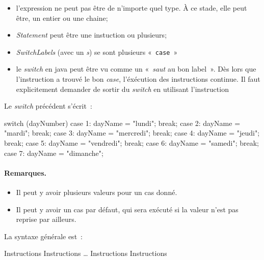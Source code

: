 	\begin{itemize}
		\item l'expression ne peut pas être de n'importe quel type. À ce stade, 
			elle peut être, un entier ou une chaine;
		\item \textit{Statement} peut être une instuction ou plusieurs;
		\item \textit{SwitchLabels} (avec un \textit{s}) se sont plusieurs 
			«~\texttt{case}~»
		
		\item le \textit{switch} en java peut être vu comme un «~\textit{saut}
			au bon label~». Dès lors que l'instruction a trouvé le bon
			\textit{case}, l'éxécution des instructions continue. Il faut
			explicitement demander de sortir du \textit{switch} en utilisant
			l'instruction \textbf{}

	\end{itemize}

	Le \textit{switch} précédent s'écrit~:

	\begin{java}
switch (dayNumber) {
	case 1: 
		dayName = "lundi"; 
		break;
	case 2: 
		dayName = "mardi"; 
		break;
	case 3: 
		dayName = "mercredi"; 
		break;
	case 4: 
		dayName = "jeudi"; 
		break;
	case 5: 
		dayName = "vendredi"; 
		break;
	case 6: 
		dayName = "samedi"; 
		break;
	case 7: 
		dayName = "dimanche";
}
	\end{java}
		
	\paragraph{Remarques.}
	\begin{itemize}
	\item
		Il peut y avoir plusieurs valeurs pour un cas donné.
	\item
		Il peut y avoir un cas par défaut, 
		qui sera exécuté si la valeur n’est pas reprise par ailleurs.
	\end{itemize}
	
	La syntaxe générale est~:
	
	\begin{pseudocode}
				\Stmt Instructions
				\Stmt Instructions
			\Empty \dots
				\Stmt Instructions
				\Stmt Instructions
		\EndSwitch
	\end{pseudocode}
	
	
